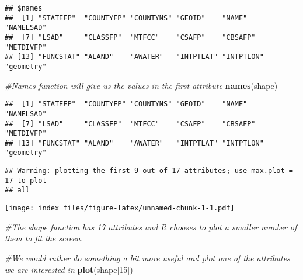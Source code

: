 \documentclass[
]{article}
\newenvironment{Shaded}{\begin{snugshade}}{\end{snugshade}}
\newcommand{\CommentTok}[1]{\textcolor[rgb]{0.56,0.35,0.01}{\textit{#1}}}
\newcommand{\DecValTok}[1]{\textcolor[rgb]{0.00,0.00,0.81}{#1}}
\newcommand{\FunctionTok}[1]{\textcolor[rgb]{0.13,0.29,0.53}{\textbf{#1}}}
\newcommand{\NormalTok}[1]{#1}
\newcommand{\OtherTok}[1]{\textcolor[rgb]{0.56,0.35,0.01}{#1}}
\newcommand{\SpecialCharTok}[1]{\textcolor[rgb]{0.81,0.36,0.00}{\textbf{#1}}}
\newcommand{\StringTok}[1]{\textcolor[rgb]{0.31,0.60,0.02}{#1}}
\begin{document}
\begin{verbatim}
## $names
##  [1] "STATEFP"  "COUNTYFP" "COUNTYNS" "GEOID"    "NAME"     "NAMELSAD"
##  [7] "LSAD"     "CLASSFP"  "MTFCC"    "CSAFP"    "CBSAFP"   "METDIVFP"
## [13] "FUNCSTAT" "ALAND"    "AWATER"   "INTPTLAT" "INTPTLON" "geometry"
\end{verbatim}

\begin{Shaded}
\begin{Highlighting}[]
\CommentTok{\#Names function will give us the values in the first attribute }
\FunctionTok{names}\NormalTok{(shape)}
\end{Highlighting}
\end{Shaded}

\begin{verbatim}
##  [1] "STATEFP"  "COUNTYFP" "COUNTYNS" "GEOID"    "NAME"     "NAMELSAD"
##  [7] "LSAD"     "CLASSFP"  "MTFCC"    "CSAFP"    "CBSAFP"   "METDIVFP"
## [13] "FUNCSTAT" "ALAND"    "AWATER"   "INTPTLAT" "INTPTLON" "geometry"
\end{verbatim}

\begin{Shaded}
\end{Shaded}

\begin{verbatim}
## Warning: plotting the first 9 out of 17 attributes; use max.plot = 17 to plot
## all
\end{verbatim}

\texttt{[image: index\_files/figure-latex/unnamed-chunk-1-1.pdf]}

\begin{Shaded}
\begin{Highlighting}[]
\CommentTok{\#The shape function has 17 attributes and R chooses to plot a smaller number of them to fit the screen. }


\CommentTok{\#We would rather do something a bit more useful and plot one of the attributes we are interested in}
\FunctionTok{plot}\NormalTok{(shape[}\DecValTok{15}\NormalTok{])}
\end{Highlighting}
\end{Shaded}
\end{document}
